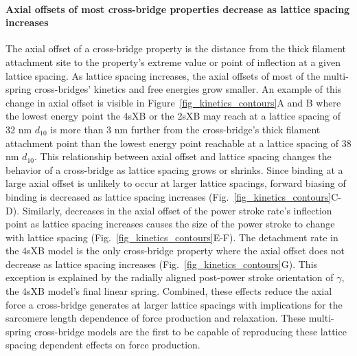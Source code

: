 \documentclass[]{article}
\begin{document}
\paragraph{Axial offsets of most cross-bridge properties decrease as lattice spacing increases} %
The axial offset of a cross-bridge property is the distance from the thick filament attachment site to the property's extreme value or point of inflection at a given lattice spacing. 
As lattice spacing increases, the axial offsets of most of the multi-spring cross-bridges' kinetics and free energies grow smaller.
An example of this change in axial offset is visible in Figure~\ref{fig_kinetics_contours}A and B where the lowest energy point the 4sXB or the 2sXB may reach at a lattice spacing of 32 nm $d_{10}$ is more than 3 nm further from the cross-bridge's thick filament attachment point than the lowest energy point reachable at a lattice spacing of 38 nm $d_{10}$. 
This relationship between axial offset and lattice spacing changes the behavior of a cross-bridge as lattice spacing grows or shrinks.
Since binding at a large axial offset is unlikely to occur at larger lattice spacings, forward biasing of binding is decreased as lattice spacing increases (Fig.~\ref{fig_kinetics_contours}C-D). 
Similarly, decreases in the axial offset of the power stroke rate's inflection point as lattice spacing increases causes the size of the power stroke to change with lattice spacing (Fig.~\ref{fig_kinetics_contours}E-F).
The detachment rate in the 4sXB model is the only cross-bridge property where the axial offset does not decrease as lattice spacing increases (Fig.~\ref{fig_kinetics_contours}G). 
This exception is explained by the radially aligned post-power stroke orientation of $\gamma$, the 4sXB model's final linear spring. 
Combined, these effects reduce the axial force a cross-bridge generates at larger lattice spacings with implications for the sarcomere length dependence of force production and relaxation. 
These multi-spring cross-bridge models are the first to be capable of reproducing these lattice spacing dependent effects on force production.
\end{document}
